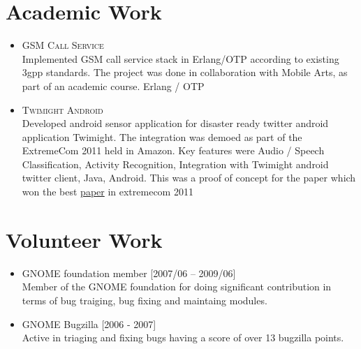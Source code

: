 \documentclass[a4paper,10pt]{article}
\begin{document}
  \section{Academic Work}
  \begin{itemize}
\item \textsc{GSM Call Service} \\

  Implemented GSM call service stack in Erlang/OTP according to existing 3gpp standards. The project
  was done in collaboration with Mobile Arts, as part of an academic course. Erlang / OTP

\item \textsc{Twimight Android} \\
  Developed android sensor application for disaster ready twitter android application Twimight. The
  integration was demoed as part of the ExtremeCom 2011 held in Amazon. Key features were Audio / Speech Classification, Activity Recognition, Integration with Twimight android twitter client, Java, Android. This was a proof of concept for the paper which won the best \href{http://www.tik.ee.ethz.ch/file/ecf9bf3e550dafdd10181f1ca6d08538/extremecom11_twimight.pdf}{paper} in extremecom 2011
  \end{itemize}

  \section {Volunteer Work}
  \begin {itemize}
  \item GNOME foundation member [2007/06 – 2009/06] \\
      Member of the GNOME foundation for doing significant contribution in terms of bug traiging, bug fixing and maintaing modules.
      
  \item GNOME Bugzilla [2006 - 2007] \\
     Active in triaging and fixing bugs having a score of over 13 bugzilla points.      
  \end {itemize}
\end{document}
